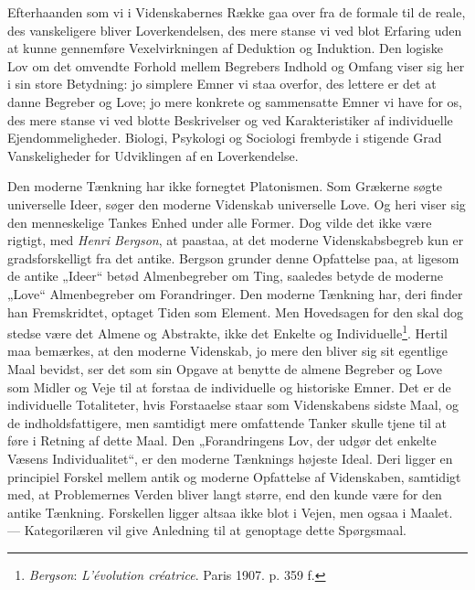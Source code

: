 \documentclass[12pt,a4paper]{book}
\newcommand{\apage}[1]{\marginnote{\footnotesize\textit{[#1]}}}
\begin{document}
Efterhaanden som vi i Videnskabernes Række gaa over fra de formale til de
reale, des vanskeligere bliver Loverkendelsen, des mere stanse vi ved
blot Erfaring uden at kunne \apage{133} gennemføre Vexelvirkningen af Deduktion og
Induktion. Den logiske Lov om det omvendte Forhold mellem Begrebers
Indhold og Omfang viser sig her i sin store Betydning: jo simplere Emner
vi staa overfor, des lettere er det at danne Begreber og Love; jo mere konkrete og sammensatte Emner vi have for os, des mere stanse vi ved
blotte Beskrivelser og ved Karakteristiker af individuelle
Ejendommeligheder. Biologi, Psykologi og Sociologi frembyde i stigende
Grad Vanskeligheder for Udviklingen af en Loverkendelse.

Den moderne Tænkning har ikke fornegtet Platonismen. Som Grækerne søgte
universelle Ideer, søger den moderne Videnskab universelle Love. Og heri
viser sig den menneskelige Tankes Enhed under alle Former. Dog vilde det
ikke være rigtigt, med \emph{Henri Bergson}, at paastaa, at det moderne
Videnskabsbegreb kun er gradsforskelligt fra det antike. Bergson grunder
denne Opfattelse paa, at ligesom de antike „Ideer“ betød Almenbegreber om
Ting, saaledes betyde de moderne „Love“ Almenbegreber om Forandringer.
Den moderne Tænkning har, deri finder han Fremskridtet, optaget Tiden som
Element. Men Hovedsagen for den skal dog stedse være det Almene og
Abstrakte, ikke det Enkelte og Individuelle\footnote{\emph{Bergson}:
\emph{L'évolution créatrice}. Paris 1907. p. 359 f.}. Hertil maa
bemærkes, at den moderne Videnskab, jo mere den bliver sig sit egentlige
Maal bevidst, ser det som sin Opgave at benytte de almene Begreber og
Love som Midler og Veje til at forstaa de individuelle og historiske
Emner. Det er de individuelle Totaliteter, hvis Forstaaelse staar
som Videnskabens sidste Maal, og de indholdsfattigere, men samtidigt
mere omfattende Tanker skulle tjene til at føre i Retning af dette Maal.
Den „Forandringens Lov, der udgør det enkelte Væsens Individualitet“, er
den moderne Tænknings højeste Ideal. Deri ligger en principiel Forskel
mellem antik og moderne Opfattelse af Videnskaben, samtidigt med, at
Problemernes Verden bliver langt større, end den kunde være for den
antike Tænkning. Forskellen ligger altsaa ikke blot i Vejen, men ogsaa i
Maalet. --- Kategorilæren vil give Anledning til at genoptage dette
Spørgsmaal.
\end{document}
